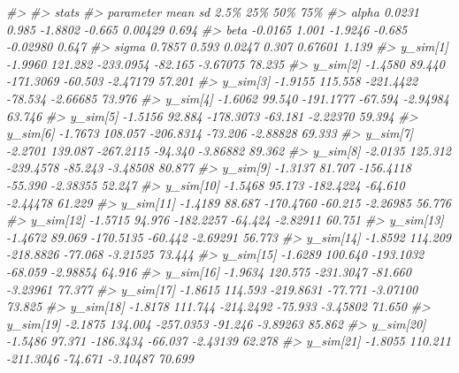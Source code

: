 \documentclass[
  10pt,
  italian,
  a4paper,
  extrafontsizes,onecolumn,openright
  ]{memoir}
\newenvironment{Shaded}{\begin{snugshade}}{\end{snugshade}}
\newcommand{\CommentTok}[1]{\textcolor[rgb]{0.56,0.35,0.01}{\textit{#1}}}
\begin{document}
\begin{Shaded}
\begin{Highlighting}[]
\CommentTok{\#\textgreater{} }
\CommentTok{\#\textgreater{}             stats}
\CommentTok{\#\textgreater{} parameter       mean      sd      2.5\%     25\%      50\%    75\%}
\CommentTok{\#\textgreater{}   alpha       0.0231   0.985   {-}1.8802  {-}0.665  0.00429  0.694}
\CommentTok{\#\textgreater{}   beta       {-}0.0165   1.001   {-}1.9246  {-}0.685 {-}0.02980  0.647}
\CommentTok{\#\textgreater{}   sigma       0.7857   0.593    0.0247   0.307  0.67601  1.139}
\CommentTok{\#\textgreater{}   y\_sim[1]   {-}1.9960 121.282 {-}233.0954 {-}82.165 {-}3.67075 78.235}
\CommentTok{\#\textgreater{}   y\_sim[2]   {-}1.4580  89.440 {-}171.3069 {-}60.503 {-}2.47179 57.201}
\CommentTok{\#\textgreater{}   y\_sim[3]   {-}1.9155 115.558 {-}221.4422 {-}78.534 {-}2.66685 73.976}
\CommentTok{\#\textgreater{}   y\_sim[4]   {-}1.6062  99.540 {-}191.1777 {-}67.594 {-}2.94984 63.746}
\CommentTok{\#\textgreater{}   y\_sim[5]   {-}1.5156  92.884 {-}178.3073 {-}63.181 {-}2.22370 59.394}
\CommentTok{\#\textgreater{}   y\_sim[6]   {-}1.7673 108.057 {-}206.8314 {-}73.206 {-}2.88828 69.333}
\CommentTok{\#\textgreater{}   y\_sim[7]   {-}2.2701 139.087 {-}267.2115 {-}94.340 {-}3.86882 89.362}
\CommentTok{\#\textgreater{}   y\_sim[8]   {-}2.0135 125.312 {-}239.4578 {-}85.243 {-}3.48508 80.877}
\CommentTok{\#\textgreater{}   y\_sim[9]   {-}1.3137  81.707 {-}156.4118 {-}55.390 {-}2.38355 52.247}
\CommentTok{\#\textgreater{}   y\_sim[10]  {-}1.5468  95.173 {-}182.4224 {-}64.610 {-}2.44478 61.229}
\CommentTok{\#\textgreater{}   y\_sim[11]  {-}1.4189  88.687 {-}170.4760 {-}60.215 {-}2.26985 56.776}
\CommentTok{\#\textgreater{}   y\_sim[12]  {-}1.5715  94.976 {-}182.2257 {-}64.424 {-}2.82911 60.751}
\CommentTok{\#\textgreater{}   y\_sim[13]  {-}1.4672  89.069 {-}170.5135 {-}60.442 {-}2.69291 56.773}
\CommentTok{\#\textgreater{}   y\_sim[14]  {-}1.8592 114.209 {-}218.8826 {-}77.068 {-}3.21525 73.444}
\CommentTok{\#\textgreater{}   y\_sim[15]  {-}1.6289 100.640 {-}193.1032 {-}68.059 {-}2.98854 64.916}
\CommentTok{\#\textgreater{}   y\_sim[16]  {-}1.9634 120.575 {-}231.3047 {-}81.660 {-}3.23961 77.377}
\CommentTok{\#\textgreater{}   y\_sim[17]  {-}1.8615 114.593 {-}219.8631 {-}77.771 {-}3.07100 73.825}
\CommentTok{\#\textgreater{}   y\_sim[18]  {-}1.8178 111.744 {-}214.2492 {-}75.933 {-}3.45802 71.650}
\CommentTok{\#\textgreater{}   y\_sim[19]  {-}2.1875 134.004 {-}257.0353 {-}91.246 {-}3.89263 85.862}
\CommentTok{\#\textgreater{}   y\_sim[20]  {-}1.5486  97.371 {-}186.3434 {-}66.037 {-}2.43139 62.278}
\CommentTok{\#\textgreater{}   y\_sim[21]  {-}1.8055 110.211 {-}211.3046 {-}74.671 {-}3.10487 70.699}

\end{Highlighting}
\end{Shaded}
\end{document}
